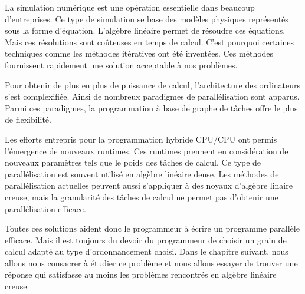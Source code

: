 La simulation numérique est une opération essentielle dans beaucoup d'entreprises.
%
Ce type de simulation se base des modèles physiques représentés sous la forme d'équation.
%
L'algèbre linéaire permet de résoudre ces équations.
%
Mais ces résolutions sont coûteuses en temps de calcul.
%
C'est pourquoi certaines techniques comme les méthodes itératives ont été inventées.
%
Ces méthodes fournissent rapidement une solution acceptable à nos problèmes.

Pour obtenir de plus en plus de puissance de calcul, l'architecture des ordinateurs s'est complexifiée.
%
Ainsi de nombreux paradigmes de parallélisation sont apparus.
%
Parmi ces paradigmes, la programmation à base de graphe de tâches offre le plus de flexibilité.

Les efforts entrepris pour la programmation hybride CPU/CPU ont permis l'émergence de nouveaux runtimes.
%
Ces runtimes prennent en considération de nouveaux paramètres tels que le poids des tâches de calcul.
%
Ce type de parallélisation est souvent utilisé en algèbre linéaire dense.
%
Les méthodes de parallélisation actuelles peuvent aussi s'appliquer à des noyaux d'algèbre linaire creuse, mais la granularité des tâches de calcul ne permet pas d'obtenir une parallélisation efficace.


Toutes ces solutions aident donc le programmeur à écrire un programme parallèle efficace.
%
Mais il est toujours du devoir du programmeur de choisir un grain de calcul adapté au type d'ordonnancement choisi.
%
Dans le chapitre suivant, nous allons nous consacrer à étudier ce problème et nous allons essayer de trouver une réponse qui satisfasse au moins les problèmes rencontrés en algèbre linéaire creuse.

